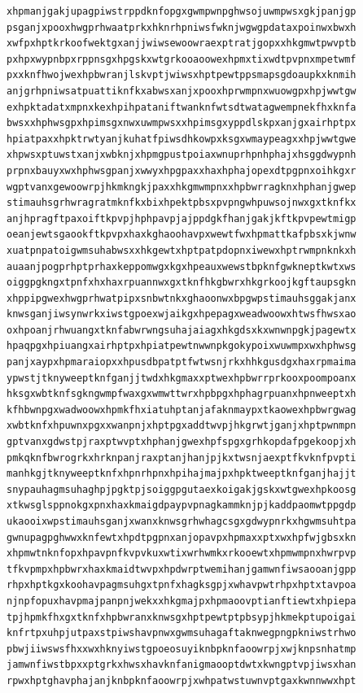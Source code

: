 \documentclass[11pt,letterpaper]{exam}
\begin{document}
\begin{questions}
\begin{verbatim}
xhpmanjgakjupagpiwstrppdknfopgxgwmpwnpghwsojuwmpwsxgkjpanjgp
psganjxpooxhwgprhwaatprkxhknrhpniwsfwknjwgwgpdataxpoinwxbwxh
xwfpxhptkrkoofwektgxanjjwiwsewoowraexptratjgopxxhkgmwtpwvptb
pxhpxwypnbpxrppnsgxhpgskxwtgrkooaoowexhpmxtixwdtpvpnxmpetwmf
pxxknfhwojwexhpbwranjlskvptjwiwsxhptpewtppsmapsgdoaupkxknmih
anjgrhpniwsatpuattiknfkxabwsxanjxpooxhprwmpnxwuowgpxhpjwwtgw
exhpktadatxmpnxkexhpihpataniftwanknfwtsdtwatagwempnekfhxknfa
bwsxxhphwsgpxhpimsgxnwxuwmpwsxxhpimsgxyppdlskpxanjgxairhptpx
hpiatpaxxhpktrwtyanjkuhatfpiwsdhkowpxksgxwmaypeagxxhpjwwtgwe
xhpwsxptuwstxanjxwbknjxhpmgpustpoiaxwnuprhpnhphajxhsggdwypnh
prpnxbauyxwxhphwsgpanjxwwyxhpgpaxxhaxhphajopexdtpgpnxoihkgxr
wgptvanxgewoowrpjhkmkngkjpaxxhkgmwmpnxxhpbwrragknxhphanjgwep
stimauhsgrhwragratmknfkxbixhpektpbsxpvpngwhpuwsojnwxgxtknfkx
anjhpragftpaxoiftkpvpjhphpavpjajppdgkfhanjgakjkftkpvpewtmigp
oeanjewtsgaookftkpvpxhaxkghaoohavpxwewtfwxhpmattkafpbsxkjwnw
xuatpnpatoigwmsuhabwsxxhkgewtxhptpatpdopnxiwewxhptrwmpnknkxh
auaanjpogprhptprhaxkeppomwgxkgxhpeauxwewstbpknfgwkneptkwtxws
oiggpgkngxtpnfxhxhaxrpuannwxgxtknfhkgbwrxhkgrkoojkgftaupsgkn
xhppipgwexhwgprhwatpipxsnbwtnkxghaoonwxbpgwpstimauhsggakjanx
knwsganjiwsynwrkxiwstgpoexwjaikgxhpepagxweadwoowxhtwsfhwsxao
oxhpoanjrhwuangxtknfabwrwngsuhajaiagxhkgdsxkxwnwnpgkjpagewtx
hpaqpgxhpiuangxairhptpxhpiatpewtnwwnpkgokypoixwuwmpxwxhphwsg
panjxaypxhpmaraiopxxhpusdbpatptfwtwsnjrkxhhkgusdgxhaxrpmaima
ypwstjtknyweeptknfganjjtwdxhkgmaxxptwexhpbwrrprkooxpoompoanx
hksgxwbtknfsgkngwmpfwaxgxwmwttwrxhpbpgxhphagrpuanxhpnweeptxh
kfhbwnpgxwadwoowxhpmkfhxiatuhptanjafaknmaypxtkaowexhpbwrgwag
xwbtknfxhpuwnxpgxxwanpnjxhptpgxaddtwvpjhkgrwtjganjxhptpwnmpn
gptvanxgdwstpjraxptwvptxhphanjgwexhpfspgxgrhkopdafpgekoopjxh
pmkqknfbwrogrkxhrknpanjraxptanjhanjpjkxtwsnjaexptfkvknfpvpti
manhkgjtknyweeptknfxhpnrhpnxhpihajmajpxhpktweeptknfganjhajjt
snypauhagmsuhaghpjpgktpjsoiggpgutaexkoigakjgskxwtgwexhpkoosg
xtkwsglsppnokgxpnxhaxkmaigdpaypvpnagkammknjpjkaddpaomwtppgdp
ukaooixwpstimauhsganjxwanxknwsgrhwhagcsgxgdwypnrkxhgwmsuhtpa
gwnupagpghwwxknfewtxhpdtpgpnxanjopavpxhpmaxxptxwxhpfwjgbsxkn
xhpmwtnknfopxhpavpnfkvpvkuxwtixwrhwmkxrkooewtxhpmwmpnxhwrpvp
tfkvpmpxhpbwrxhaxkmaidtwvpxhpdwrptwemihanjgamwnfiwsaooanjgpp
rhpxhptkgxkoohavpagmsuhgxtpnfxhagksgpjxwhavpwtrhpxhptxtavpoa
njnpfopuxhavpmajpanpnjwekxxhkgmajpxhpmaoovptianftiewtxhpiepa
tpjhpmkfhxgxtknfxhpbwranxknwsgxhptpewtptpbsypjhkmekptupoigai
knfrtpxuhpjutpaxstpiwshavpnwxgwmsuhagaftaknwegpngpkniwstrhwo
pbwjiiwswsfhxxwxhknyiwstgpoeosuyiknbpknfaoowrpjxwjknpsnhatmp
jamwnfiwstbpxxptgrkxhwsxhavknfanigmaooptdwtxkwngptvpjiwsxhan
rpwxhptghavphajanjknbpknfaoowrpjxwhpatwstuwnvptgaxkwnnwwxhpt

\end{verbatim}
\end{questions}
\end{document}
